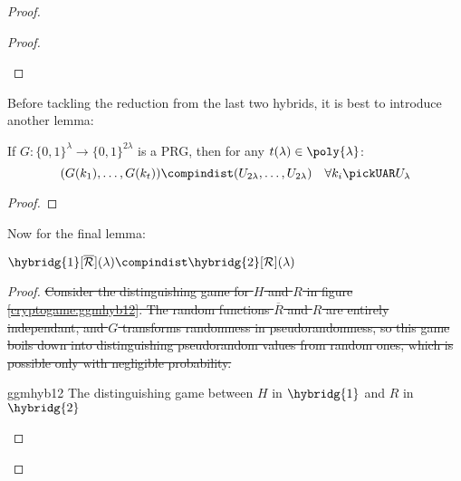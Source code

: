 \begin{proof}
\begin{proof}
\begin{cryptoredux}


        \end{cryptoredux}

    \end{proof}

    Before tackling the reduction from the last two hybrids, it is best to introduce another lemma:

    \begin{lemma}
        If $G : \{0, 1\}^\lambda \to \{0, 1\}^{2\lambda}$ is a PRG, then for any $t(\lambda) \in \poly{\lambda}$:
        \[
            (G(k_1), \dots , G(k_t)) \compindist (U_{2\lambda}, \dots , U_{2\lambda}) \quad \forall k_i \pickUAR U_\lambda
        \]
    \end{lemma}

    \begin{proof}
    \end{proof}

    Now for the final lemma:

    \begin{lemma}
        $\hybridg{1}[\overline{\R}](\lambda) \compindist \hybridg{2}[\R](\lambda)$       
    \end{lemma}
    
    \begin{proof}
        
        
        \sout{Consider the distinguishing game for $H$ and $R$ in figure \ref{cryptogame:ggmhyb12}. The random functions $\overline{R}$ and $R$ are entirely independant, and $G$ transforms randomness in pseudorandomness, so this game boils down into distinguishing pseudorandom values from random ones, which is possible only with negligible probability.}
        
        \begin{cryptogame}
            {ggmhyb12}
            {The distinguishing game between $H$ in $\hybridg{1}$ and $R$ in $\hybridg{2}$}
            {}



\end{cryptogame}
\end{proof}
\end{proof}
